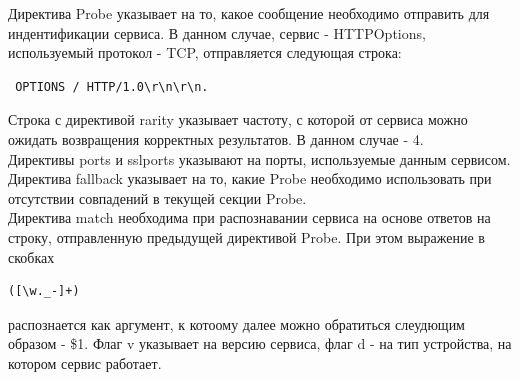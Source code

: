 \documentclass[10pt,a4paper]{report}
\begin{document}
Директива Probe указывает на то, какое сообщение необходимо отправить для индентификации сервиса. В данном случае, сервис - HTTPOptions, используемый протокол - TCP, отправляется следующая строка:
\begin{verbatim}
 OPTIONS / HTTP/1.0\r\n\r\n. 
\end{verbatim}
Строка с директивой rarity указывает частоту, с которой от сервиса можно ожидать возвращения корректных результатов. В данном случае - 4. \\
Директивы ports и sslports указывают на порты, используемые данным сервисом. \\
Директива fallback указывает на то, какие Probe необходимо использовать при отсутствии совпадений в текущей секции Probe. \\
Директива match необходима при распознавании сервиса на основе ответов на строку, отправленную предыдущей директивой Probe. При этом выражение в скобках 
\begin{verbatim}
([\w._-]+)
\end{verbatim} распознается как аргумент, к котоому далее можно обратиться слеудющим образом - \$1. Флаг v указывает на версию сервиса, флаг d - на тип устройства, на котором сервис работает. \\
\end{document}

